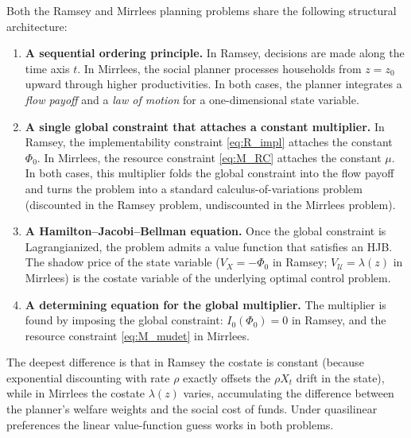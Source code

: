 \documentclass[12pt]{article}
\newcommand{\calU}{\mathcal{U}}
\newcommand{\zlow}{z_{0}}
\begin{document}
Both the Ramsey and Mirrlees planning problems share the following structural
architecture:

\begin{enumerate}[(1)]

\item \textbf{A sequential ordering principle.}  In Ramsey, decisions are made
along the time axis $t$.  In Mirrlees, the social planner processes
households from $z = \zlow$ upward through higher productivities.  In both
cases, the planner integrates a \emph{flow payoff} and a \emph{law of motion}
for a one-dimensional state variable.

\item \textbf{A single global constraint that attaches a constant multiplier.}
In Ramsey, the implementability constraint \eqref{eq:R_impl} attaches the
constant $\Phi_0$.  In Mirrlees, the resource constraint \eqref{eq:M_RC}
attaches the constant $\mu$.  In both cases, this multiplier folds the global
constraint into the flow payoff and turns the problem into a standard
calculus-of-variations problem (discounted in the Ramsey problem, undiscounted in the Mirrlees problem).

\item \textbf{A Hamilton--Jacobi--Bellman equation.}  Once the global
constraint is Lagrangianized, the problem admits a value function that
satisfies an HJB.  The shadow price of the state variable ($V_X = -\Phi_0$ in
Ramsey; $V_\calU = \lambda(z)$ in Mirrlees) is the costate variable of the
underlying optimal control problem.

\item \textbf{A determining equation for the global multiplier.}  The multiplier
is found by imposing the global constraint: $I_0(\Phi_0) = 0$ in Ramsey, and
the resource constraint \eqref{eq:M_mudet} in Mirrlees.

\end{enumerate}

\noindent The deepest difference is that in Ramsey the costate is constant
(because exponential discounting with rate $\rho$ exactly offsets the $\rho
X_t$ drift in the state), while in Mirrlees the costate $\lambda(z)$ varies,
accumulating the difference between the planner's welfare weights and the
social cost of funds.  Under quasilinear preferences the linear value-function
guess works in both problems.

\appendix
\end{document}
